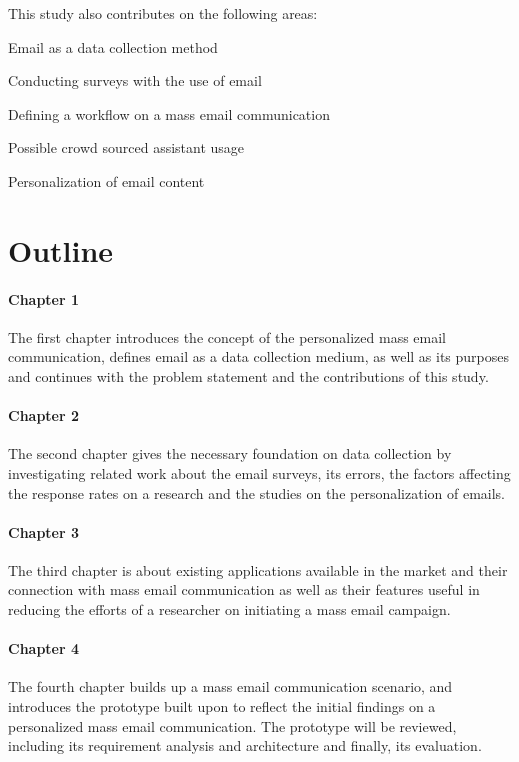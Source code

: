 This study also contributes on the following areas:

\begin{compactenum}
	\item Email as a data collection method
	\item Conducting surveys with the use of email
	\item Defining a workflow on a mass email communication
	\item Possible crowd sourced assistant usage
	\item Personalization of email content
\end{compactenum}

\section{Outline}
\label{sec:3:Outline}

\paragraph{Chapter 1} The first chapter introduces the concept of the personalized mass email communication, defines email as a data collection medium, as well as its purposes and continues with the problem statement and the contributions of this study.
  
\paragraph{Chapter 2} The second chapter gives the necessary foundation on data collection by investigating related work about the email surveys, its errors, the factors affecting the response rates on a research and the studies on the personalization of emails.

\paragraph{Chapter 3} The third chapter is about existing applications available in the market and their connection with mass email communication as well as their features useful in reducing the efforts of a researcher on initiating a mass email campaign.

\paragraph{Chapter 4} The fourth chapter builds up a mass email communication scenario, and introduces the prototype built upon to reflect the initial findings on a personalized mass email communication. The prototype will be reviewed, including its requirement analysis and architecture and finally, its evaluation.

